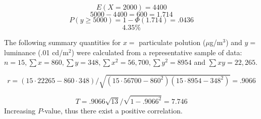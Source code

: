 \begin{questions}
\begin{solution}
        $$E(X = 2000) = 4400$$
        $$5000 - 4400 = 600 = 1.714$$
        $$P(y \ge 5000) = 1 - \Phi(1.714) = .0436$$
        $$4.35\%$$

    \end{solution}


    \question[2] The following summary quantities for $x = $
    particulate polution ($\mu$g/m$^3$) and $y = $ luminance (.01
    cd/m$^2$) were calculated from a representative sample of data: $n
    = 15, \sum x = 860, \sum y = 348, \sum x^2 = 56,700, \sum y^2 =
    8954$ and $\sum xy = 22,265$.

    \begin{solution}

        $$r = (15 \cdot 22265 - 860 \cdot 348)/\sqrt{(15 \cdot 56700 -
        860^2)(15 \cdot 8954 - 348^2)} = .9066$$

        $$T = .9066 \sqrt{13}/\sqrt{1 - .9066^2} = 7.746$$
        Increasing $P$-value, thus there exist a positive correlation.

    \end{solution}
    
\end{questions}

